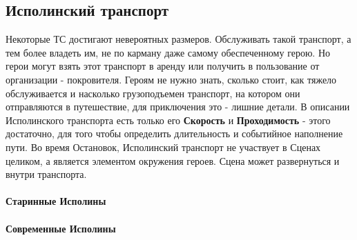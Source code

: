 \subsection{Исполинский транспорт}
Некоторые ТС достигают невероятных размеров. Обслуживать такой транспорт, а тем более владеть им, не по карману даже самому обеспеченному герою. Но герои могут взять этот транспорт в аренду или получить в пользование от организации - покровителя.
\newline Героям не нужно знать, сколько стоит, как тяжело обслуживается и насколько грузоподъемен транспорт, на котором они отправляются в путешествие, для приключения это - лишние детали. В описании Исполинского транспорта есть только его \textbf{Скорость} и \textbf{Проходимость} - этого достаточно, для того чтобы определить длительность и событийное наполнение пути. 
\newline Во время Остановок, Исполинский транспорт не участвует в Сценах целиком, а является элементом окружения героев. Сцена может развернуться и внутри транспорта.
\paragraph{Старинные Исполины}
\paragraph{Современные Исполины}

